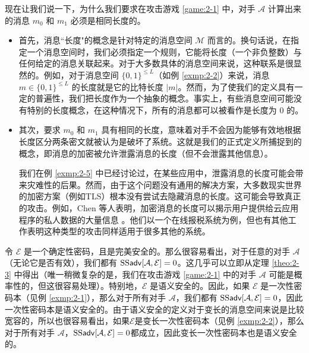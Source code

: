 \begin{remark}\label{remark:2-1}
现在让我们说一下，为什么我们要求在攻击游戏 \ref{game:2-1} 中，对手 $\mathcal{A}$ 计算出来的消息 $m_0$ 和 $m_1$ 必须是相同长度的。
\begin{itemize}
	\item 首先，消息``长度"的概念是针对特定的消息空间 $\mathcal{M}$ 而言的。换句话说，在指定一个消息空间时，我们必须指定一个规则，它能将长度（一个非负整数）与任何给定的消息关联起来。对于大多数具体的消息空间来说，这种联系是很显然的。例如，对于消息空间 $\{0, 1\}^{\leq L}$（如例 \ref{exmp:2-2}）来说，消息 $m\in\{0, 1\}^{\leq L}$ 的长度就是它的比特长度 $|m|$。然而，为了使我们的定义具有一定的普遍性，我们把长度作为一个抽象的概念。事实上，有些消息空间可能没有特别的长度概念，在这种情况下，所有的消息都可以被看作是长度为 $0$ 的。
	\item 其次，要求 $m_0$ 和 $m_1$ 具有相同的长度，意味着对手不会因为能够有效地根据长度区分两条密文就被认为是破坏了系统。这就是我们的正式定义所捕捉到的概念，即消息的加密被允许泄露消息的长度（但不会泄露其他信息）。
		
	我们在例 \ref{exmp:2-5} 中已经讨论过，在某些应用中，泄露消息的长度可能会带来灾难性的后果。然而，由于这个问题没有通用的解决方案，大多数现实世界的加密方案（例如TLS）根本没有尝试去隐藏消息的长度。这可能会导致真正的攻击。例如，Chen 等人表明，加密消息的长度可以揭示用户提供给云应用程序的私人数据的大量信息 \cite{chen2010side}。他们以一个在线报税系统为例，但也有其他工作表明这种类型的攻击同样适用于很多其他的系统。
\end{itemize}
\end{remark}

\begin{example}\label{exmp:2-9}
令 $\mathcal{E}$ 是一个确定性密码，且是完美安全的。那么很容易看出，对于任意的对手 $\mathcal{A}$（无论它是否有效），我们都有 ${\rm SS\mathsf{adv}}[\mathcal{A},\mathcal{E}]=0$。这几乎可以立即从定理 \ref{theo:2-3} 中得出（唯一稍微复杂的是，我们在攻击游戏 \ref{game:2-1} 中的对手 $\mathcal{A}$ 可能是概率性的，但这很容易处理）。特别地，$\mathcal{E}$ 是语义安全的。因此，如果 $\mathcal{E}$ 是一次性密码本（见例 \ref{exmp:2-1}），那么对于所有对手 $\mathcal{A}$，我们都有 ${\rm SS\mathsf{adv}}[\mathcal{A},\mathcal{E}]=0$，因此一次性密码本是语义安全的。由于语义安全的定义对于变长的消息空间来说是比较宽容的，所以也很容易看出，如果$\mathcal{E}$是变长一次性密码本（见例 \ref{exmp:2-2}），那么对于所有对手 $\mathcal{A}$，${\rm SS\mathsf{adv}}[\mathcal{A},\mathcal{E}]=0$都成立，因此变长一次性密码本也是语义安全的。
\end{example}

